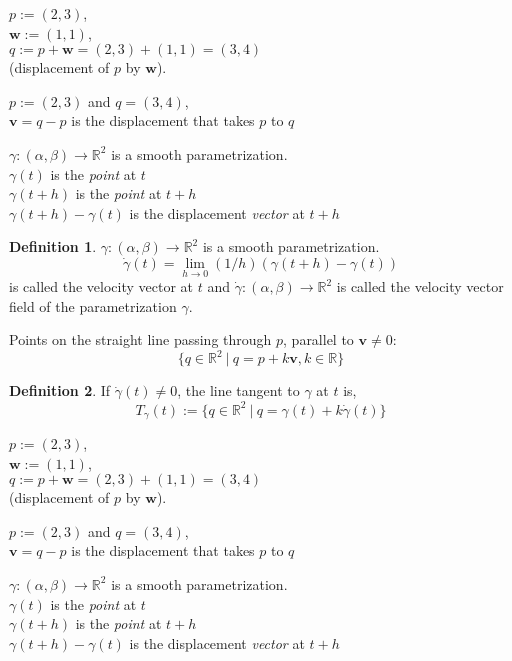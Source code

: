 \documentclass[twocolumn,20pt,fleqn]{extarticle}
\newcommand{\sep}{\vspace{0.5cm}}
\theoremstyle{plain}
\theoremstyle{definition}
\newtheorem*{definition}{Definition}
\theoremstyle{remark}
\begin{document}
\clearpage



$p := (2,3)$,\\ $\mathbf{w} := (1,1)$,\\ $q:=p + \mathbf{w} = (2,3) + (1,1) = (3,4)$ \\ (displacement of $p$ by $\mathbf{w}$).

\sep
$p := (2,3)$ and $q=(3,4)$,\\
$\mathbf{v}= q - p$ is the displacement that takes $p$ to $q$ 
\sep

$\gamma : (\alpha,\beta) \to \mathbb{R}^2$ is a smooth parametrization.\\
$\gamma(t)$ is the \emph{point} at $t$\\
$\gamma(t+h)$ is the \emph{point} at $t+h$\\
$\gamma(t+h)-\gamma(t)$ is the displacement \emph{vector} at $t+h$\\



\begin{definition}
$\gamma : (\alpha,\beta) \to \mathbb{R}^2$ is a smooth parametrization.
\[\dot{\gamma}(t) = \lim_{h\to 0} (1/h)(\gamma(t+h) - \gamma(t))\]
is called the velocity vector at $t$ and $\dot{\gamma} : (\alpha, \beta) \to \mathbb{R}^2$ is called the velocity vector field of the parametrization $\gamma$.
\end{definition}
\newpage
Points on the straight line passing through $p$, parallel to $\mathbf{v}\neq 0$:
\[\{q \in \mathbb{R}^2 \ |\ q = p  + k\mathbf{v} , k \in \mathbb{R}\}\]

\begin{definition}
  If $\dot{\gamma}(t)\neq 0$, the line tangent to $\gamma$ at $t$ is,
  \[T_\gamma(t):=\{q \in \mathbb{R}^2 \ |\ q = \gamma(t) + k\dot{\gamma}(t) \}\]\end{definition}


\clearpage



$p := (2,3)$,\\ $\mathbf{w} := (1,1)$,\\ $q:=p + \mathbf{w} = (2,3) + (1,1) = (3,4)$ \\ (displacement of $p$ by $\mathbf{w}$).

\sep
$p := (2,3)$ and $q=(3,4)$,\\
$\mathbf{v}= q - p$ is the displacement that takes $p$ to $q$ 
\sep

$\gamma : (\alpha,\beta) \to \mathbb{R}^2$ is a smooth parametrization.\\
$\gamma(t)$ is the \emph{point} at $t$\\
$\gamma(t+h)$ is the \emph{point} at $t+h$\\
$\gamma(t+h)-\gamma(t)$ is the displacement \emph{vector} at $t+h$\\
\end{document}
